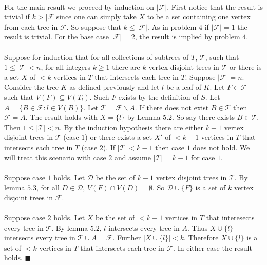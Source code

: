 \documentclass[letterpaper,12pt,oneside,onecolumn]{report}
\begin{document}
\paragraph{}
For the main result we proceed by induction on $|\mathcal{F}|$. First notice that the result is trivial if $k > |\mathcal{F}$ since one can simply take $X$ to be a set containing one vertex from each tree in $\mathcal{F}$. So suppose that $k \leq |\mathcal{F}|$. As in problem $4$ if $|\mathcal{F}| = 1$ the result is trivial. For the base case $|\mathcal{F}| = 2$, the result is implied by problem $4$.
\paragraph{}
Suppose for induction that for all collections of subtrees of $T$, $\mathcal{T}$, such that $1 \leq |\mathcal{T}| < n$, for all integers $k \geq 1$ there are $k$ vertex disjoint trees in $\mathcal{T}$ or there is a set $X$ of $<k$ vertices in $T$ that intersects each tree in $T$. Suppose $|\mathcal{F}| = n$. Consider the tree $K$ as defined previously and let $l$ be a leaf of $K$. Let $F \in \mathcal{F}$ such that $V(F) \subseteq V(T_l)$. Such $F$ exists by the definition of $S$. Let $A = \{ B \in \mathcal{F} : l \in V(B)\}$. Let $\mathcal{T} = \mathcal{F} \backslash A$. If there does not exist $B \in \mathcal{T}$ then $\mathcal{F} = A$. The result holds with $X = \{l\}$ by Lemma $5.2$. So say there exists $B \in \mathcal{T}$. Then $1 \leq |\mathcal{T}| < n$. By the induction hypothesis there are either $k-1$ vertex disjoint trees in $\mathcal{T}$ (case $1$) or there exists a set $X'$ of $ < k-1$ vertices in $T$ that intersects each tree in $T$ (case $2$). If $|\mathcal{T}| < k - 1$ then case $1$ does not hold. We will treat this scenario with case $2$ and assume $|\mathcal{T}| = k - 1$ for case $1$.
\paragraph{}
Suppose case $1$ holds. Let $\mathcal{D}$ be the set of $k-1$ vertex disjoint trees in $\mathcal{T}$. By lemma $5.3$, for all $D \in \mathcal{D}$, $V(F) \cap V(D) = \emptyset$. So $\mathcal{D} \cup \{F\}$ is a set of $k$ vertex disjoint trees in $\mathcal{F}$.
\paragraph{}
Suppose case $2$ holds. Let $X$ be the set of $< k-1$ vertices in $T$ that interesects every tree in $\mathcal{T}$. By lemma $5.2$, $l$ intersects every tree in $A$. Thus $X \cup \{l\}$ intersects every tree in $\mathcal{T} \cup A = \mathcal{F}$. Further $|X \cup \{l\}| < k$. Therefore $X \cup \{l\}$ is a set of $< k$ vertices in $T$ that intersects each tree in $\mathcal{F}$. In either case the result holds. $\blacksquare$  
\end{document}
